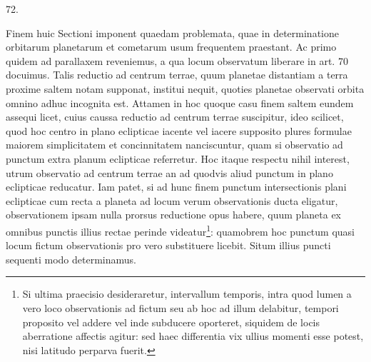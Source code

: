 \par{}\medskip
\hypertarget{native-094-article072}{}
\begin{center}72.\end{center}
Finem huic Sectioni imponent quaedam problemata, quae in determinatione orbitarum planetarum et cometarum usum frequentem praestant. Ac primo quidem ad parallaxem reveniemus, a qua locum observatum liberare in art. 70 docuimus. Talis reductio ad centrum terrae, quum planetae distantiam a terra proxime saltem notam supponat, institui nequit, quoties planetae observati orbita omnino adhuc incognita est. Attamen in hoc quoque casu finem saltem eundem assequi licet, cuius caussa reductio ad centrum terrae suscipitur, ideo scilicet, quod hoc centro in plano eclipticae iacente vel iacere supposito plures formulae maiorem simplicitatem et concinnitatem nanciscuntur, quam si observatio ad punctum extra planum eclipticae referretur. Hoc itaque respectu nihil interest, utrum observatio ad centrum terrae an ad quodvis aliud punctum in plano eclipticae reducatur. Iam patet, si ad hunc finem punctum intersectionis plani eclipticae cum recta a planeta ad locum verum observationis ducta eligatur, observationem ipsam nulla prorsus reductione opus habere, quum planeta ex omnibus punctis illius rectae perinde videatur\footnote{Si ultima praecisio desideraretur, intervallum temporis, intra quod lumen a vero loco observationis ad fictum seu ab hoc ad illum delabitur, tempori proposito vel addere vel inde subducere oporteret, siquidem de locis aberratione affectis agitur: sed haec differentia vix ullius momenti esse potest, nisi latitudo perparva fuerit.}: quamobrem hoc punctum quasi locum fictum observationis pro vero substituere licebit. Situm illius puncti sequenti modo determinamus.

